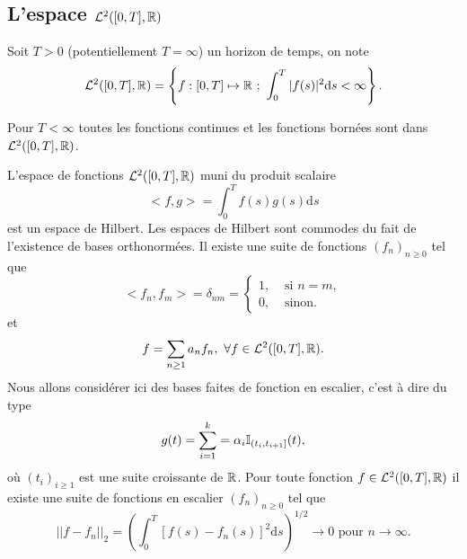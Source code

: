 \subsection{L'espace $\mathcal{L}^2([0,T],\mathbb{R})$}\label{ssec:espace_L2}
Soit $T>0$ (potentiellement $T=\infty$) un horizon de temps, on note 
$$
\mathcal{L}^2([0,T],\mathbb{R}) = \left\{f:[0,T]\mapsto \mathbb{R} \text{ ; }\int_0^T|f(s)|^2\text{d}s <\infty\right\}.
$$
\begin{remark}
Pour $T<\infty$ toutes les fonctions continues et les fonctions bornées sont dans $\mathcal{L}^2([0,T],\mathbb{R})$. 
\end{remark}
L'espace de fonctions $\mathcal{L}^2([0,T],\mathbb{R})$ muni du produit scalaire 
$$
<f,g> = \int_0^Tf(s)g(s)\text{d}s
$$
est un espace de Hilbert. Les espaces de Hilbert sont commodes du fait de l'existence de bases orthonormées. Il existe une suite de fonctions $(f_n)_{n\geq 0}$ tel que 
$$
<f_n, f_m> =\delta_{nm} =\begin{cases}1,&\text{ si }n=m,\\
0,&\text{ sinon.}
\end{cases}
$$
et 
$$
f = \sum_{n\geq 1}a_n f_n,\text{ }\forall f\in\mathcal{L}^2([0,T],\mathbb{R}).
$$
Nous allons considérer ici des bases faites de fonction en escalier, c'est à dire du type
$$
g(t) = \sum_{i=1}^{k}= \alpha_i\mathbb{I}_{(t_i,t_{i+1}]}(t), 
$$
où $(t_i)_{i\geq1}$ est une suite croissante de $\mathbb{R}$. Pour toute fonction $f\in\mathcal{L}^2([0,T],\mathbb{R})$ il existe une suite de fonctions en escalier $(f_n)_{n\geq 0}$ tel que 
$$
||f-f_n||_2 = \left(\int_0^T\left[f(s)-f_n(s)\right]^2\text{d}s\right)^{1/2}\rightarrow 0\text{ pour }n\rightarrow \infty.
$$
